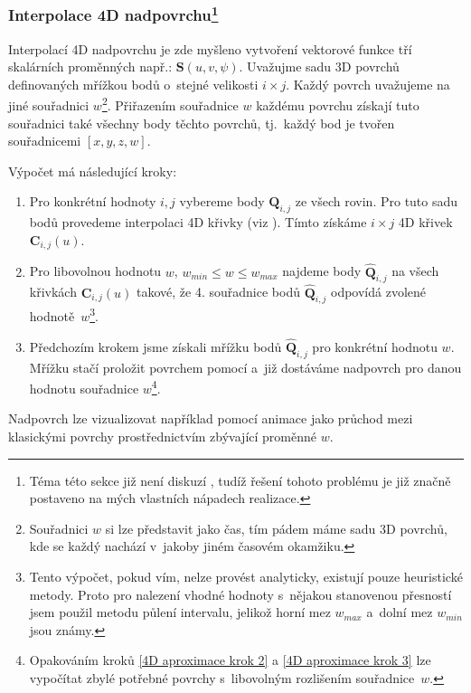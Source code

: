 \subsubsection[Interpolace 4D nadpovrchu]{Interpolace 4D nadpovrchu\footnote{Téma této sekce již není diskuzí \cite{The_NURBS_Book}, tudíž řešení tohoto problému je již značně postaveno na mých vlastních nápadech realizace.}}\label{section:interpolace 4D povrchu}
Interpolací 4D nadpovrchu je zde myšleno vytvoření vektorové funkce tří skalárních proměnných např.: $\bm{S}(u,v,\psi)$. Uvažujme sadu 3D povrchů definovaných mřížkou bodů o~stejné velikosti $i \times j$. Každý povrch uvažujeme na jiné souřadnici $w$\footnote{Souřadnici $w$ si lze představit jako čas, tím pádem máme sadu 3D povrchů, kde se každý nachází v~jakoby jiném časovém okamžiku.}. Přiřazením souřadnice $w$ každému povrchu získají tuto souřadnici také všechny body těchto povrchů, tj.~každý bod je tvořen souřadnicemi $[x,y,z,w]$. \par
Výpočet má následující kroky:
\begin{enumerate}
    \item Pro konkrétní hodnoty $i, j$ vybereme body $\bm{Q}_{i,j}$ ze všech rovin.
          Pro tuto sadu bodů provedeme interpolaci 4D křivky (viz ).
          Tímto získáme $i\times j$ 4D křivek $\bm{C}_{i,j}(u)$.
    \item \label{4D aproximace krok 2} Pro libovolnou hodnotu $w$, $w_{min} \le w \le w_{max}$ najdeme body $\hat{\bm{Q}}_{i,j}$ na všech křivkách $\bm{C}_{i,j}(u)$ takové, že 4. souřadnice bodů $\hat{\bm{Q}}_{i,j}$ odpovídá zvolené hodnotě~$w$\footnote{Tento výpočet, pokud vím, nelze provést analyticky, existují pouze heuristické metody. Proto pro nalezení vhodné hodnoty s~nějakou stanovenou přesností jsem použil metodu půlení intervalu, jelikož horní mez $w_{max}$ a~dolní mez $w_{min}$ jsou známy.}.
    \item \label{4D aproximace krok 3} Předchozím krokem jsme získali mřížku bodů $\hat{\bm{Q}}_{i,j}$ pro konkrétní hodnotu $w$.
          Mřížku stačí proložit povrchem pomocí  a~již dostáváme nadpovrch pro danou hodnotu souřadnice $w$\footnote{Opakováním kroků \ref{4D aproximace krok 2} a \ref{4D aproximace krok 3} lze vypočítat zbylé potřebné povrchy s~libovolným rozlišením souřadnice~$w$.}.
\end{enumerate}
Nadpovrch lze vizualizovat například pomocí animace jako průchod mezi klasickými povrchy prostřednictvím zbývající proměnné $w$.
